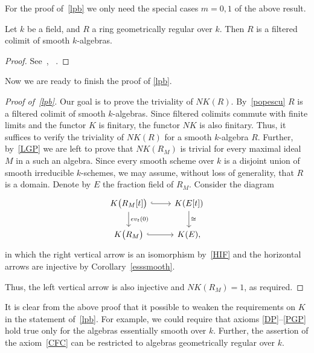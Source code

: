 \documentclass[oneside, 11pt]{amsart} \pdfoutput=1
\begin{document}
\begin{rem}
For the proof of~\cref{lpb} we only need the special cases $m=0,1$ of the above result.
\end{rem}

\begin{theorem}[Popescu]
\label{popescu} Let $k$ be a field, and $R$ a ring geometrically regular over $k$. Then $R$ is a filtered colimit of smooth $k$-algebras. \end{theorem}
\begin{proof} See~\cite{Po85}, ~\cite[Theorem~1.1]{Sw98}.
\end{proof}

Now we are ready to finish the proof of \cref{lpb}. %
\begin{proof}[Proof of~\cref{lpb}]
Our goal is to prove the triviality of $NK(R)$.
By~\cref{popescu} $R$ is a filtered colimit of smooth $k$-algebras.
Since filtered colimits commute with finite limits and the functor $K$ is finitary, the functor $NK$ is also finitary.
Thus, it suffices to verify the triviality of $NK(R)$ for a smooth $k$-algebra $R$.
Further, by~\cref{LGP} we are left to prove that $NK(R_M)$ is trivial for every maximal ideal $M$ in a such an algebra.
Since every smooth scheme over $k$ is a disjoint union of smooth irreducible $k$-schemes, we may assume, without loss of generality, that $R$ is a domain.
Denote by $E$ the fraction field of $R_M$. Consider the diagram
\[\begin{tikzcd}
K\bigl(R_M[t]\bigr) \ar[hookrightarrow]{r} \ar{d}{ev_t(0)} & K(E[t]) \ar{d}{\cong}\\
K\bigl(R_M\bigr) \ar[hookrightarrow]{r} & K(E),
\end{tikzcd}\]
in which the right vertical arrow is an isomorphism by~\ref{HIF} and the horizontal arrows are injective by Corollary~\ref{esssmooth}.


Thus, the left vertical arrow is also injective and $NK(R_M) = 1$, as required.
\end{proof}
\begin{rem}\label{rem:relax}
It is clear from the above proof that it possible to weaken the requirements on $K$ in the statement of~\cref{lpb}. For example, we could require that axioms \ref{DP}--\ref{PGP} hold true only for the algebras essentially smooth over $k$. Further, the assertion of the axiom~\ref{CFC} can be restricted to algebras geometrically regular over $k$.
\end{rem}
\end{document}
